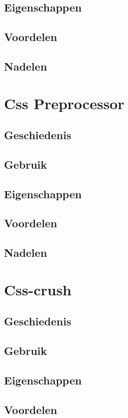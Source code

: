 \documentclass[pdftex,a4paper,12pt,twoside]{report}
\begin{document}
\subsection{Eigenschappen}
\subsection{Voordelen}
\subsection{Nadelen}



\section{Css Preprocessor}
\subsection{Geschiedenis}
\subsection{Gebruik}
\subsection{Eigenschappen}
\subsection{Voordelen}
\subsection{Nadelen}


\section{Css-crush}
\subsection{Geschiedenis}
\subsection{Gebruik}
\subsection{Eigenschappen}
\subsection{Voordelen}
\end{document}
